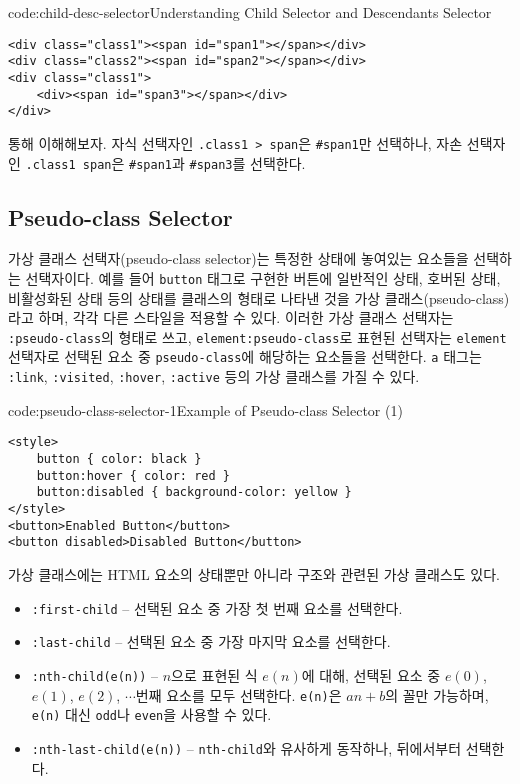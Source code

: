 \begin{codeenv}{code:child-desc-selector}{Understanding Child Selector and Descendants Selector}\begin{verbatim}
<div class="class1"><span id="span1"></span></div>
<div class="class2"><span id="span2"></span></div>
<div class="class1">
    <div><span id="span3"></span></div>
</div>
\end{verbatim}
\end{codeenv}

\를 통해 이해해보자. 자식 선택자인 \texttt{.class1 > span}은 \texttt{\#span1}만 선택하나, 자손 선택자인 \texttt{.class1 span}은 \texttt{\#span1}과 \texttt{\#span3}를 선택한다.

\subsection*{Pseudo-class Selector}
가상 클래스 선택자(pseudo-class selector)는 특정한 상태에 놓여있는 요소들을 선택하는 선택자이다. 예를 들어 \texttt{button} 태그로 구현한 버튼에 일반적인 상태, 호버된 상태, 비활성화된 상태 등의 상태를 클래스의 형태로 나타낸 것을 가상 클래스(pseudo-class)라고 하며, 각각 다른 스타일을 적용할 수 있다. 이러한 가상 클래스 선택자는 \texttt{:pseudo-class}의 형태로 쓰고, \texttt{element:pseudo-class}로 표현된 선택자는 \texttt{element} 선택자로 선택된 요소 중 \texttt{pseudo-class}에 해당하는 요소들을 선택한다. \texttt{a} 태그는 \texttt{:link}, \texttt{:visited}, \texttt{:hover}, \texttt{:active} 등의 가상 클래스를 가질 수 있다.

\begin{codeenv}{code:pseudo-class-selector-1}{Example of Pseudo-class Selector (1)}\begin{verbatim}
<style>
    button { color: black }
    button:hover { color: red }
    button:disabled { background-color: yellow }
</style>
<button>Enabled Button</button>
<button disabled>Disabled Button</button>
\end{verbatim}
\end{codeenv}

가상 클래스에는 HTML 요소의 상태뿐만 아니라 구조와 관련된 가상 클래스도 있다.

\begin{itemize}
    \item \texttt{:first-child} – 선택된 요소 중 가장 첫 번째 요소를 선택한다.
    \item \texttt{:last-child} – 선택된 요소 중 가장 마지막 요소를 선택한다.
    \item \texttt{:nth-child(e(n))} – $n$으로 표현된 식 $e(n)$에 대해, 선택된 요소 중 $e(0)$, $e(1)$, $e(2)$, $\cdots$번째 요소를 모두 선택한다. \texttt{e(n)}은 $an+b$의 꼴만 가능하며, \texttt{e(n)} 대신 \texttt{odd}나 \texttt{even}을 사용할 수 있다.
    \item \texttt{:nth-last-child(e(n))} – \texttt{nth-child}와 유사하게 동작하나, 뒤에서부터 선택한다.
\end{itemize}

